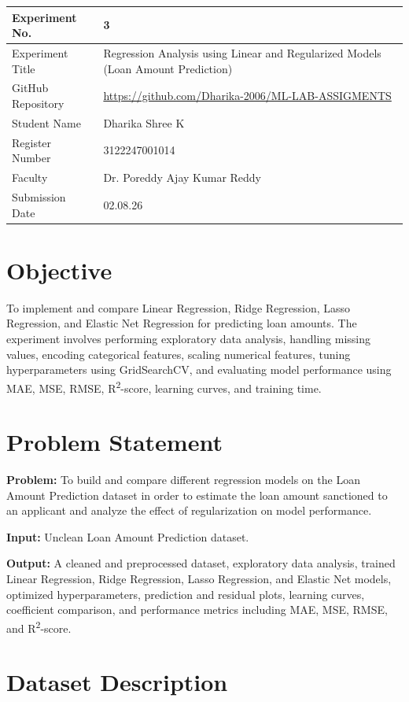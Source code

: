 \documentclass[12pt,a4paper]{article}
\begin{document}
\begin{tabular}{|p{4cm}|p{11cm}|}
\hline
Experiment No. & 3\\ \hline
Experiment Title & Regression Analysis using Linear and Regularized Models (Loan Amount Prediction)\\ \hline
GitHub Repository & \url{https://github.com/Dharika-2006/ML-LAB-ASSIGMENTS} \\ \hline
Student Name & Dharika Shree K\\ \hline
Register Number & 3122247001014\\ \hline
Faculty & Dr. Poreddy Ajay Kumar Reddy \\ \hline
Submission Date & 02.08.26\\ \hline
\end{tabular}
\section{Objective}

To implement and compare Linear Regression, Ridge Regression, Lasso Regression, and Elastic Net Regression for predicting loan amounts. The experiment involves performing exploratory data analysis, handling missing values, encoding categorical features, scaling numerical features, tuning hyperparameters using GridSearchCV, and evaluating model performance using MAE, MSE, RMSE, R\textsuperscript{2}-score, learning curves, and training time.

\section{Problem Statement}

\textbf{Problem:} To build and compare different regression models on the Loan Amount Prediction dataset in order to estimate the loan amount sanctioned to an applicant and analyze the effect of regularization on model performance.

\textbf{Input:} Unclean Loan Amount Prediction dataset.

\textbf{Output:} A cleaned and preprocessed dataset, exploratory data analysis, trained Linear Regression, Ridge Regression, Lasso Regression, and Elastic Net models, optimized hyperparameters, prediction and residual plots, learning curves, coefficient comparison, and performance metrics including MAE, MSE, RMSE, and R\textsuperscript{2}-score.

\section{Dataset Description}
\end{document}
